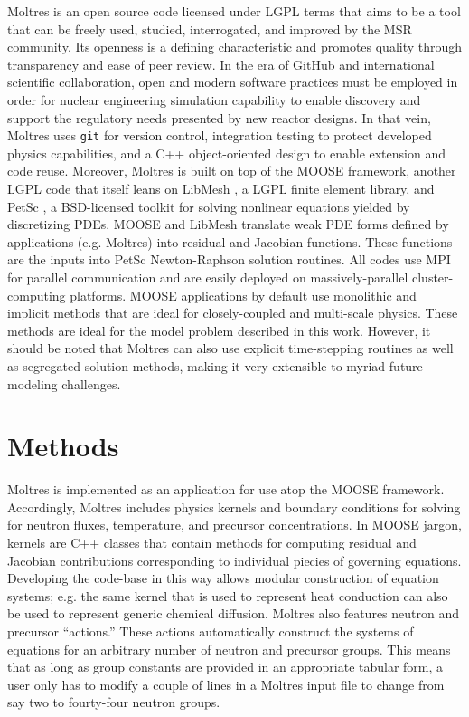 \documentclass{article}
\let\Oldsection\section
\renewcommand{\section}{\FloatBarrier\Oldsection}
\begin{document}
Moltres is an open source code licensed under \gls{LGPL} terms that aims to be a
tool that can be freely used, studied, interrogated, and improved by the
\gls{MSR} community.  Its openness is a defining characteristic and promotes
quality through transparency and ease of peer review. In the era of
GitHub\cite{noauthor_build_nodate} and international scientific collaboration,
open and modern software practices must be employed in order for nuclear
engineering simulation capability to enable discovery and support the regulatory
needs presented by new reactor designs. In that vein, Moltres uses
\texttt{git} for version control, integration testing to protect
developed physics capabilities, and a C++ object-oriented design to
enable extension and code reuse. Moreover, Moltres is built on
top of the \gls{MOOSE} framework, \cite{gaston_physics-based_2015} another
\gls{LGPL} code that itself leans on LibMesh \cite{kirk_libmesh:_2006}, a
\gls{LGPL} finite element library, and PetSc \cite{satish_balay_petsc_2015}, a
\gls{BSD}-licensed toolkit for solving nonlinear equations yielded by 
discretizing PDEs. \gls{MOOSE} and LibMesh translate weak PDE forms defined by
applications (e.g. Moltres) into residual and Jacobian
functions. These functions are the inputs into PetSc Newton-Raphson solution routines. All
codes use MPI for parallel communication and are easily deployed on
massively-parallel cluster-computing platforms. \gls{MOOSE} applications by
default use monolithic and implicit methods that are ideal for closely-coupled
and multi-scale physics. These methods are ideal for the model problem described
in this work. However, it should be noted that Moltres can also use explicit
time-stepping routines as well as segregated solution methods, making it very
extensible to myriad future modeling challenges.

\section{Methods}

Moltres \cite{lindsay_arfc/moltres_nodate} is implemented as an application for
use atop the \gls{MOOSE} \cite{gaston_physics-based_2015} framework.
Accordingly, Moltres includes physics kernels and boundary conditions for
solving for neutron fluxes, temperature, and precursor concentrations. In \gls{MOOSE}
jargon, kernels are C++ classes that contain methods for computing residual and
Jacobian contributions corresponding to individual piecies of governing
equations. Developing the code-base in this way allows modular construction
of equation systems; e.g. the same kernel that is used to represent heat
conduction can also be used to represent generic chemical diffusion. Moltres
also features neutron and precursor ``actions.'' These actions automatically 
construct the systems of equations for an arbitrary number of neutron and
precursor groups. This means that as long as group constants are provided in an appropriate
tabular form, a user only has to modify a couple of lines in a Moltres input
file to change from say two to fourty-four neutron groups.
\end{document}
